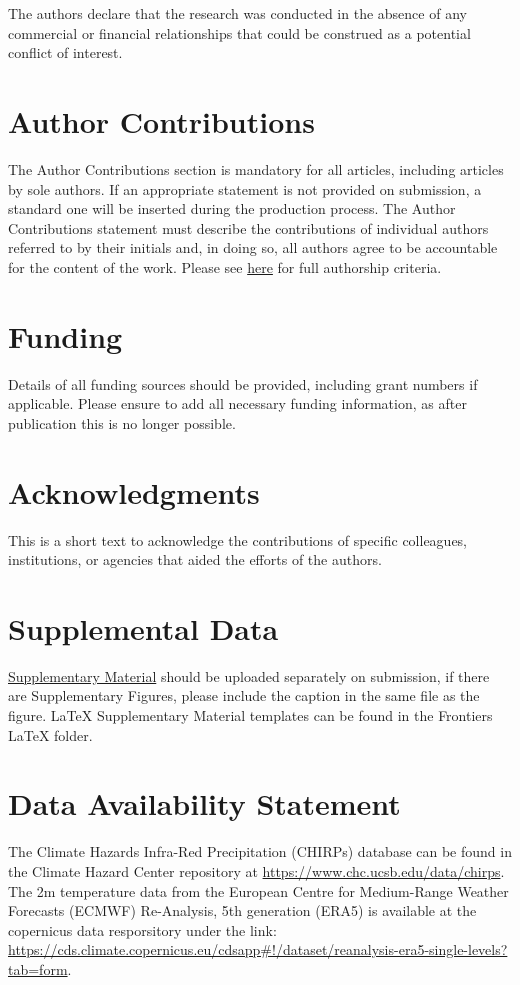 \documentclass[utf8]{FrontiersinHarvard} %
\begin{document}
The authors declare that the research was conducted in the absence of any commercial or financial relationships that could be construed as a potential conflict of interest.

\section*{Author Contributions}

The Author Contributions section is mandatory for all articles, including articles by sole authors. If an appropriate statement is not provided on submission, a standard one will be inserted during the production process. The Author Contributions statement must describe the contributions of individual authors referred to by their initials and, in doing so, all authors agree to be accountable for the content of the work. Please see  \href{https://www.frontiersin.org/about/policies-and-publication-ethics#AuthorshipAuthorResponsibilities}{here} for full authorship criteria.

\section*{Funding}
Details of all funding sources should be provided, including grant numbers if applicable. Please ensure to add all necessary funding information, as after publication this is no longer possible.

\section*{Acknowledgments}
This is a short text to acknowledge the contributions of specific colleagues, institutions, or agencies that aided the efforts of the authors.

\section*{Supplemental Data}
 \href{http://home.frontiersin.org/about/author-guidelines#SupplementaryMaterial}{Supplementary Material} should be uploaded separately on submission, if there are Supplementary Figures, please include the caption in the same file as the figure. LaTeX Supplementary Material templates can be found in the Frontiers LaTeX folder.

\section*{Data Availability Statement}
\noindent The Climate Hazards Infra-Red Precipitation (CHIRPs) database can be found in the Climate Hazard Center repository at \url{https://www.chc.ucsb.edu/data/chirps}. \\
The 2m temperature data from the European Centre for Medium-Range Weather Forecasts (ECMWF) Re-Analysis, 5th generation (ERA5) is available at the copernicus data resporsitory under the link: \url{https://cds.climate.copernicus.eu/cdsapp#!/dataset/reanalysis-era5-single-levels?tab=form}. \\
\end{document}
